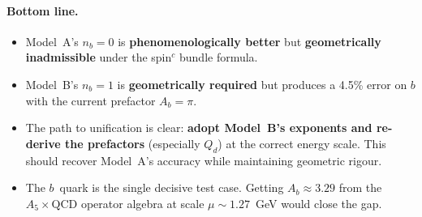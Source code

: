 \documentclass[11pt]{article}
\begin{document}
\paragraph{Bottom line.}
\begin{itemize}
  \item Model~A's $n_b = 0$ is \textbf{phenomenologically better} but
    \textbf{geometrically inadmissible} under the spin$^c$ bundle formula.
  \item Model~B's $n_b = 1$ is \textbf{geometrically required} but produces
    a 4.5\% error on $b$ with the current prefactor $A_b = \pi$.
  \item The path to unification is clear: \textbf{adopt Model~B's exponents
    and re-derive the prefactors} (especially $Q_d$) at the correct
    energy scale.  This should recover Model~A's accuracy while maintaining
    geometric rigour.
  \item The $b$~quark is the single decisive test case.  Getting
    $A_b \approx 3.29$ from the $A_5 \times \mathrm{QCD}$ operator algebra
    at scale $\mu \sim 1.27$~GeV would close the gap.
\end{itemize}
\end{document}
